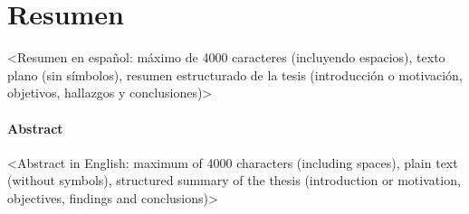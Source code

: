%

\chapter{Resumen}
\label{ch::resumen}

<Resumen en español: máximo de 4000 caracteres (incluyendo espacios), texto plano (sin símbolos), resumen estructurado de la tesis (introducción o motivación, objetivos, hallazgos y conclusiones)>

\subsubsection*{Abstract}
\label{sec::abstract}

<Abstract in English: maximum of 4000 characters (including spaces), plain text (without symbols), structured summary of the thesis (introduction or motivation, objectives, findings and conclusions)>


